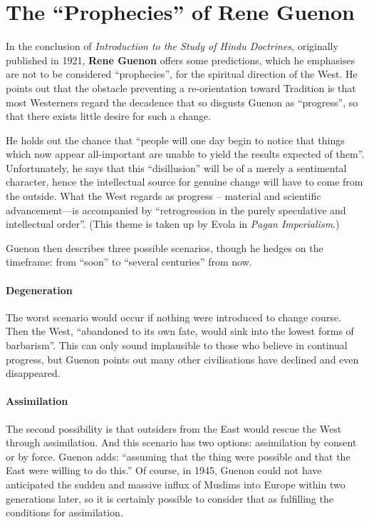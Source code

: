 \section{The “Prophecies”  of  Rene Guenon}

In the conclusion of \emph{Introduction to the Study of Hindu Doctrines}, originally published in 1921, \textbf{Rene Guenon} offers some predictions, which he emphasises are not to be considered ``prophecies'', for the spiritual direction of the West. He points out that the obstacle preventing a re-orientation toward Tradition is that most Westerners regard the decadence that so disgusts Guenon as ``progress'', so that there exists little desire for such a change.

He holds out the chance that ``people will one day begin to notice that things which now appear all-important are unable to yield the results expected of them''. Unfortunately, he says that this ``disillusion'' will be of a merely a sentimental character, hence the intellectual source for genuine change will have to come from the outside. What the West regards as progress -- material and scientific advancement---is accompanied by ``retrogression in the purely speculative and intellectual order''. (This theme is taken up by Evola in \emph{Pagan Imperialism}.)

Guenon then describes three possible scenarios, though he hedges on the timeframe: from ``soon'' to ``several centuries'' from now.

\paragraph{Degeneration}


The worst scenario would occur if nothing were introduced to change course. Then the West, ``abandoned to its own fate, would sink into the lowest forms of barbarism''. This can only sound implausible to those who believe in continual progress, but Guenon points out many other civilisations have declined and even disappeared.

\paragraph{Assimilation}


The second possibility is that outsiders from the East would rescue the West through assimilation. And this scenario has two options: assimilation by consent or by force. Guenon adds: ``assuming that the thing were possible and that the East were willing to do this.'' Of course, in 1945, Guenon could not have anticipated the sudden and massive influx of Muslims into Europe within two generations later, so it is certainly possible to consider that as fulfilling the conditions for assimilation.

